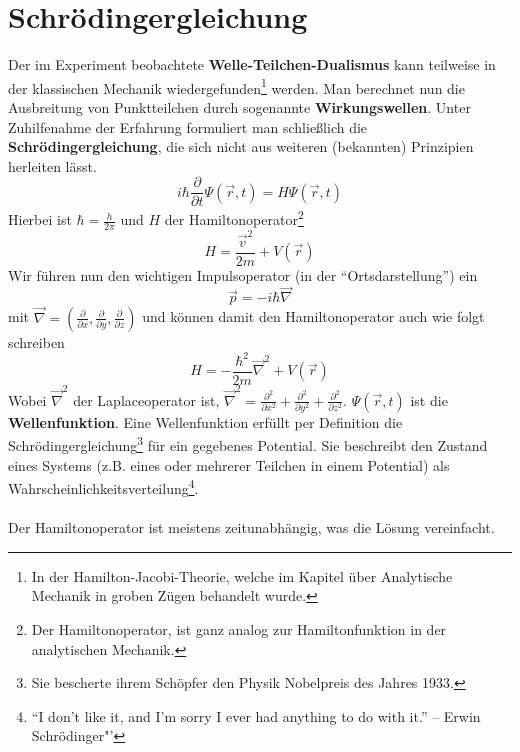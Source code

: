 \documentclass[oneside]{book}
\theoremstyle{definition}
\newcommand{\fpartial}[1]{\frac{\partial}{\partial #1}}
\newcommand{\ffpartial}[2]{\frac{\partial #1}{\partial #2}}
\begin{document}
\section{Schrödingergleichung}
Der im Experiment beobachtete \textbf{Welle-Teilchen-Dualismus} kann teilweise in der klassischen Mechanik wiedergefunden\footnote{In der Hamilton-Jacobi-Theorie, welche im Kapitel über Analytische Mechanik in groben Zügen behandelt wurde.} werden. Man berechnet nun die Ausbreitung von Punktteilchen durch sogenannte \textbf{Wirkungswellen}. Unter Zuhilfenahme der Erfahrung formuliert man schließlich die \textbf{Schrödingergleichung}, die sich nicht aus weiteren (bekannten) Prinzipien herleiten lässt.
$$i \hbar \fpartial{t} \Psi(\vec{r}, t) = H \Psi(\vec{r}, t)$$
Hierbei ist $\hbar = \frac{h}{2 \pi}$ und $H$ der Hamiltonoperator\footnote{Der Hamiltonoperator, ist ganz analog zur Hamiltonfunktion in der analytischen Mechanik.}
$$H = \frac{\vec{v}^2}{2m} + V(\vec{r})$$
Wir führen nun den wichtigen Impulsoperator (in der "`Ortsdarstellung"') ein
$$\vec{p} = - i \hbar \vec{\nabla}$$
mit $\vec{\nabla} = (\fpartial{x}, \fpartial{y}, \fpartial{z})$ und können damit den Hamiltonoperator auch wie folgt schreiben
$$H = - \frac{\hbar^2}{2m} \vec{\nabla}^2 + V(\vec{r})$$
Wobei $\vec{\nabla}^2$ der Laplaceoperator ist, $\vec{\nabla}^2 = \ffpartial{^2}{x^2} +\ffpartial{^2}{y^2} + \ffpartial{^2}{z^2}$.
$\Psi(\vec{r}, t)$ ist die \textbf{Wellenfunktion}. Eine Wellenfunktion erfüllt per Definition die Schrödingergleichung\footnote{Sie bescherte ihrem Schöpfer den Physik Nobelpreis des Jahres 1933.} für ein gegebenes Potential. Sie beschreibt den Zustand eines Systems (z.B. eines oder mehrerer Teilchen in einem Potential) als Wahrscheinlichkeitsverteilung\footnote{"`I don't like it, and I'm sorry I ever had anything to do with it."' – Erwin Schrödinger"'}. \\
~\\
Der Hamiltonoperator ist meistens zeitunabhängig, was die Lösung vereinfacht. 
\end{document}
